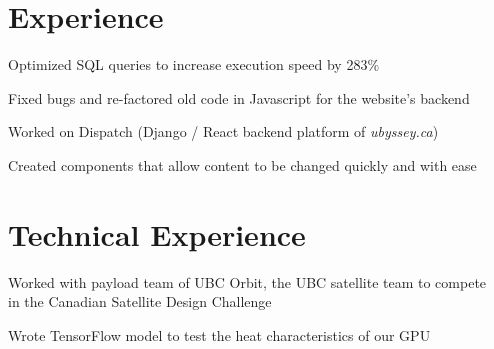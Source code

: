 \documentclass[]{deedy-resume-openfont}
\begin{document}
    
    
    
    
    
    \section{Experience}
    
    \begin{tightemize}
    \item Optimized SQL queries to increase execution speed by 283\%
    \item Fixed bugs and re-factored old code in Javascript for the website’s backend
    \end{tightemize}
    \sectionsep
    
    \begin{tightemize}
    \item Worked on Dispatch (Django / React backend platform of \textit{ubyssey.ca})
    \item Created components that allow content to be changed quickly and with ease
    \end{tightemize}
    \sectionsep
    
    \section{Technical Experience}
    
    \begin{tightemize}
    \item Worked with payload team of UBC Orbit, the UBC satellite team to compete \\ in the Canadian Satellite Design Challenge 
    \item Wrote TensorFlow model to test the heat characteristics of our GPU 
    \end{tightemize}
    \sectionsep
    
\end{document}
